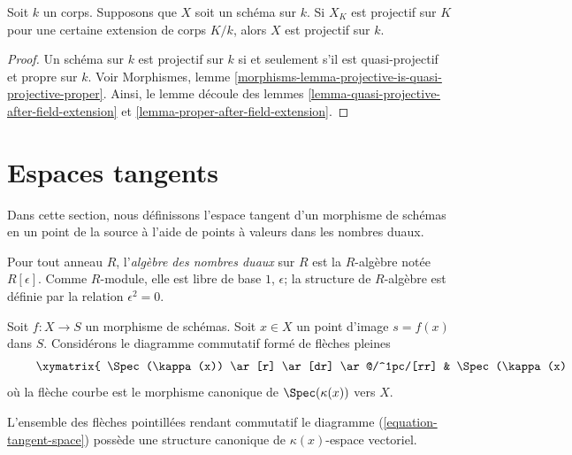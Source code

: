 \begin{lemma}
\label{lemma-projective-after-field-extension}
Soit $k$ un corps. Supposons que $X$ soit un
schéma sur $k$. Si $X_K$ est projectif sur $K$ pour une
certaine extension de corps $K/k$, alors $X$ est projectif sur $k$.
\end{lemma}

\begin{proof}
Un schéma sur $k$ est projectif sur $k$ si et
seulement s'il est quasi-projectif et propre sur $k$.
Voir Morphismes, lemme
\ref{morphisms-lemma-projective-is-quasi-projective-proper}.
Ainsi, le lemme découle des lemmes
\ref{lemma-quasi-projective-after-field-extension} et \ref{lemma-proper-after-field-extension}.
\end{proof}




\section{Espaces tangents}
\label{section-tangent-spaces}

\noindent
Dans cette section, nous définissons l'espace tangent d'un morphisme de schémas
en un point de la source à l'aide de points à valeurs dans les nombres duaux.

\begin{definition}
\label{definition-dual-numbers}
Pour tout anneau $R$, l'{\it algèbre des nombres duaux} sur $R$
est la $R$-algèbre notée $R[\epsilon]$. Comme $R$-module,
elle est libre de base $1$, $\epsilon$; la structure de
$R$-algèbre est définie par la relation $\epsilon^2 = 0$.
\end{definition}

\noindent
Soit $f : X \to S$ un morphisme de schémas.
Soit $x \in X$ un point d'image $s =
f(x)$ dans $S$. Considérons le diagramme commutatif formé de flèches pleines
\begin{equation}
\label{equation-tangent-space}
\vcenter{
\xymatrix{
\Spec(\kappa(x)) \ar[r] \ar[dr] \ar@/^1pc/[rr] &
\Spec(\kappa(x)[\epsilon]) \ar@{.>}[r] \ar[d]&
X \ar[d] \\
&
\Spec(\kappa(s)) \ar[r] &
S
}
}
\end{equation}
où la flèche courbe est le morphisme
canonique de $\Spec(\kappa(x))$ vers $X$.

\begin{lemma}
\label{lemma-tangent-space}
L'ensemble des flèches pointillées rendant commutatif le diagramme
(\ref{equation-tangent-space}) possède une structure canonique de $\kappa(x)$-espace vectoriel.
\end{lemma}

